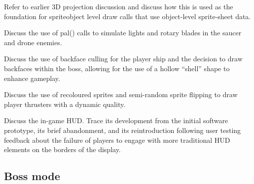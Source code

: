 \documentclass{article}
\begin{document}
Refer to earlier 3D projection discussion and discuss how this is used as the foundation for
spriteobject level draw calls that use object-level sprite-sheet data.

Discuss the use of pal() calls to simulate lights and rotary blades in the saucer and drone
enemies.

Discuss the use of backface culling for the player ship and the decision to draw backfaces
within the boss, allowing for the use of a hollow ``shell'' shape to enhance gameplay.

Discuss the use of recoloured sprites and semi-random sprite flipping to draw player thrusters
with a dynamic quality.

Discuss the in-game HUD. Trace its development from the initial software prototype, its brief
abandonment, and its reintroduction following user testing feedback about the failure of players
to engage with more traditional HUD elements on the borders of the display.

\subsection{Boss mode}
\end{document}
